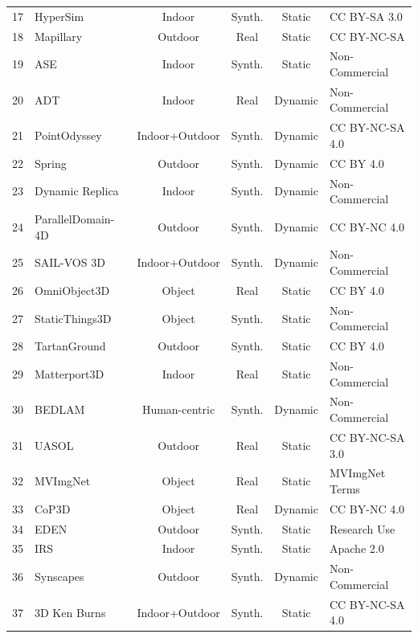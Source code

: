\documentclass{llmxive}
\begin{document}
\begin{table}[h]
\begin{tabularx}{\textwidth}{@{}c >{\centering\arraybackslash}X c c c >{\centering\arraybackslash}X@{}}
17 & HyperSim~\cite{roberts2021hypersim} & Indoor & Synth. & Static & CC BY-SA 3.0 \\
18 & Mapillary~\cite{antequera2020mapillary} & Outdoor & Real & Static & CC BY-NC-SA \\
19 & ASE~\cite{avetisyan2024scenescript} & Indoor & Synth. & Static & Non-Commercial \\
20 & ADT~\cite{pan2023aria} & Indoor & Real & Dynamic & Non-Commercial \\
21 & PointOdyssey~\cite{zheng2023pointodyssey} & Indoor+Outdoor & Synth. & Dynamic & CC BY-NC-SA 4.0 \\
22 & Spring~\cite{mehl2023spring} & Outdoor & Synth. & Dynamic & CC BY 4.0 \\
23 & Dynamic Replica~\cite{Karaev_2023_dynamic_stereo} & Indoor & Synth. & Dynamic & Non-Commercial \\
24 & ParallelDomain-4D~\cite{vanhoorick2024gcd} & Outdoor & Synth. & Dynamic & CC BY-NC 4.0 \\
25 & SAIL-VOS 3D~\cite{hu2021sailvos3d} & Indoor+Outdoor & Synth. & Dynamic & Non-Commercial \\
26 & OmniObject3D~\cite{wu2023omniobject3d} & Object & Real & Static & CC BY 4.0 \\
27 & StaticThings3D~\cite{schroeppel2022rmvd} & Object & Synth. & Static & Non-Commercial \\
28 & TartanGround~\cite{patel2025tartanground} & Outdoor & Synth. & Static & CC BY 4.0 \\
29 & Matterport3D~\cite{chang2017matterport3d} & Indoor & Real & Static & Non-Commercial \\
30 & BEDLAM~\cite{black2023bedlam} & Human-centric & Synth. & Dynamic & Non-Commercial \\
31 & UASOL~\cite{bauer2019uasol} & Outdoor & Real & Static & CC BY-NC-SA 3.0 \\
32 & MVImgNet~\cite{yu2023mvimgnet} & Object & Real & Static & MVImgNet Terms \\
33 & CoP3D~\cite{sinha2023cop3d} & Object & Real & Dynamic & CC BY-NC 4.0 \\
34 & EDEN~\cite{le2021eden} & Outdoor & Synth. & Static & Research Use \\
35 & IRS~\cite{wang2021irs} & Indoor & Synth. & Static & Apache 2.0 \\
36 & Synscapes~\cite{wrenninge2018synscapes} & Outdoor & Synth. & Dynamic & Non-Commercial \\
37 & 3D Ken Burns~\cite{niklaus2019kenburns} & Indoor+Outdoor & Synth. & Static & CC BY-NC-SA 4.0 \\

\end{tabularx}
\end{table}
\end{document}
